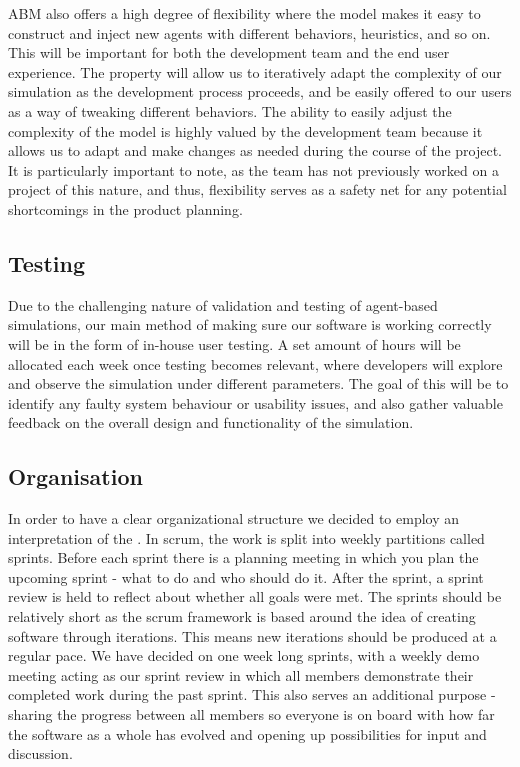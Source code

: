     ABM also offers a high degree of flexibility where the model makes it easy to construct and inject new agents with different behaviors, heuristics, and so on. This will be important for both the development team and the end user experience. The property will allow us to iteratively adapt the complexity of our simulation as the development process proceeds, and be easily offered to our users as a way of tweaking different behaviors. The ability to easily adjust the complexity of the model is highly valued by the development team because it allows us to adapt and make changes as needed during the course of the project. It is particularly important to note, as the team has not previously worked on a project of this nature, and thus, flexibility serves as a safety net for any potential shortcomings in the product planning.

\subsection{Testing}
    Due to the challenging nature of validation and testing of agent-based simulations, our main method of making sure our software is working correctly will be in the form of in-house user testing. A set amount of hours will be allocated each week once testing becomes relevant, where developers will explore and observe the simulation under different parameters. The goal of this will be to identify any faulty system behaviour or usability issues, and also gather valuable feedback on the overall design and functionality of the simulation.

\subsection{Organisation}
    In order to have a clear organizational structure we decided to employ an interpretation of the  \cite{scrum}. In scrum, the work is split into weekly partitions called sprints. Before each sprint there is a planning meeting in which you plan the upcoming sprint - what to do and who should do it. After the sprint, a sprint review is held to reflect about whether all goals were met. The sprints should be relatively short as the scrum framework is based around the idea of creating software through iterations. This means new iterations should be produced at a regular pace. We have decided on one week long sprints, with a weekly demo meeting acting as our sprint review in which all members demonstrate their completed work during the past sprint. This also serves an additional purpose - sharing the progress between all members so everyone is on board with how far the software as a whole has evolved and opening up possibilities for input and discussion.

